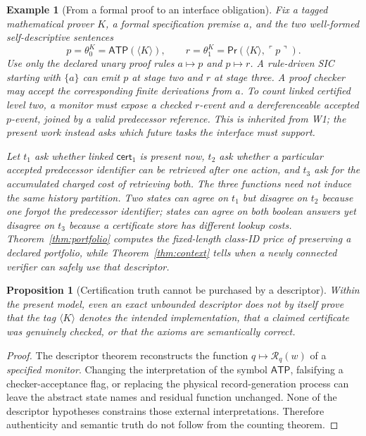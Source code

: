 \documentclass[11pt,letterpaper]{article}
\newtheorem{proposition}[theorem]{Proposition}
\newtheorem{example}[theorem]{Example}
\newcommand{\cert}{\mathsf{cert}}
\newcommand{\ATP}{\mathsf{ATP}}
\newcommand{\Prv}{\mathsf{Pr}}
\newcommand{\R}{\mathcal{R}}
\begin{document}
\begin{example}[From a formal proof to an interface obligation]\label{ex:self}
Fix a tagged mathematical prover $K$, a formal specification premise $a$, and the two well-formed self-descriptive sentences
\[
 p=\theta_0^K=\ATP(\langle K\rangle),\qquad
 r=\theta_1^K=\Prv(\langle K\rangle,\ulcorner p\urcorner).
\]
Use only the declared unary proof rules $a\mapsto p$ and $p\mapsto r$. A rule-driven SIC starting with $\{a\}$ can emit $p$ at stage two and $r$ at stage three. A proof checker may accept the corresponding finite derivations from $a$. To count \emph{linked certified level two}, a monitor must expose a checked $r$-event \emph{and} a dereferenceable accepted $p$-event, joined by a valid predecessor reference. This is inherited from W1; the present work instead asks which future tasks the interface must support.

Let $t_1$ ask whether linked $\cert_1$ is present now, $t_2$ ask whether a particular accepted predecessor identifier can be retrieved after one action, and $t_3$ ask for the accumulated charged cost of retrieving both. The three functions need not induce the same history partition. Two states can agree on $t_1$ but disagree on $t_2$ because one forgot the predecessor identifier; states can agree on both boolean answers yet disagree on $t_3$ because a certificate store has different lookup costs. Theorem~\ref{thm:portfolio} computes the fixed-length class-ID price of preserving a declared portfolio, while Theorem~\ref{thm:context} tells when a newly connected verifier can safely use that descriptor.
\end{example}

\begin{proposition}[Certification truth cannot be purchased by a descriptor]\label{prop:trust}
Within the present model, even an exact unbounded descriptor does not by itself prove that the tag $\langle K\rangle$ denotes the intended implementation, that a claimed certificate was genuinely checked, or that the axioms are semantically correct.
\end{proposition}
\begin{proof}
The descriptor theorem reconstructs the function $q\mapsto\R_q(w)$ of a \emph{specified monitor}. Changing the interpretation of the symbol $\ATP$, falsifying a checker-acceptance flag, or replacing the physical record-generation process can leave the abstract state names and residual function unchanged. None of the descriptor hypotheses constrains those external interpretations. Therefore authenticity and semantic truth do not follow from the counting theorem.
\end{proof}
\end{document}

